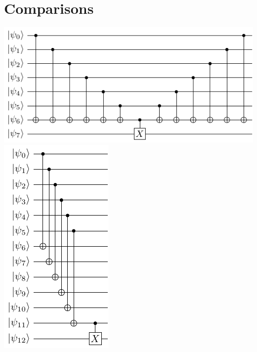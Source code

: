 \documentclass[a4paper,twocolumn,11pt,accepted=2017-05-09]{quantumarticle}
\begin{document}
 \section{Comparisons}

    
    \includegraphics{../examples/diagrams/simu.pdf}
    \includegraphics{../examples/diagrams/cnu.pdf}
\end{document}
